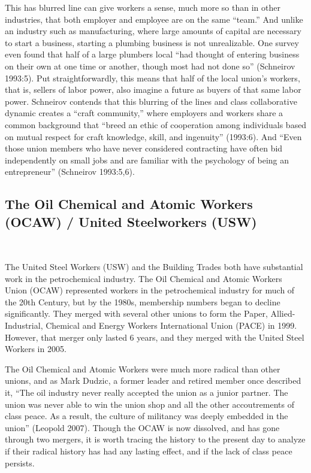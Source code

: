 This has blurred line can give workers a sense, much more so than in other industries, that both employer and employee are on the same “team.” And unlike an industry such as manufacturing, where large amounts of capital are necessary to start a business, starting a plumbing business is not unrealizable. One survey even found that half of a large plumbers local “had thought of entering business on their own at one time or another, though most had not done so” (Schneirov 1993:5). Put straightforwardly, this means that half of the local union’s workers, that is, sellers of labor power, also imagine a future as buyers of that same labor power. Schneirov contends that this blurring of the lines and class collaborative dynamic creates a “craft community,” where employers and workers share a common background that “breed an ethic of cooperation among individuals based on mutual respect for craft knowledge, skill, and ingenuity” (1993:6). And “Even those union members who have never considered contracting have often bid independently on small jobs and are familiar with the psychology of being an entrepreneur” (Schneirov 1993:5,6). 



\subsection{The Oil Chemical and Atomic Workers (OCAW) / United Steelworkers (USW)} \

The United Steel Workers (USW) and the Building Trades both have substantial work in the petrochemical industry. The Oil Chemical and Atomic Workers Union (OCAW) represented workers in the petrochemical industry for much of the 20th Century, but by the 1980s, membership numbers began to decline significantly. They merged with several other unions to form the Paper, Allied-Industrial, Chemical and Energy Workers International Union (PACE) in 1999. However, that merger only lasted 6 years, and they merged with the United Steel Workers in 2005.

The Oil Chemical and Atomic Workers were much more radical than other unions, and as Mark Dudzic, a former leader and retired member once described it, “The oil industry never really accepted the union as a junior partner. The union was never able to win the union shop and all the other accoutrements of class peace. As a result, the culture of militancy was deeply embedded in the union” (Leopold 2007). Though the OCAW is now dissolved, and has gone through two mergers, it is worth tracing the history to the present day to analyze if their radical history has had any lasting effect, and if the lack of class peace persists.

